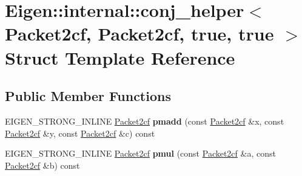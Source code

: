 \hypertarget{struct_eigen_1_1internal_1_1conj__helper_3_01_packet2cf_00_01_packet2cf_00_01true_00_01true_01_4}{}\section{Eigen\+::internal\+::conj\+\_\+helper$<$ Packet2cf, Packet2cf, true, true $>$ Struct Template Reference}
\label{struct_eigen_1_1internal_1_1conj__helper_3_01_packet2cf_00_01_packet2cf_00_01true_00_01true_01_4}
\subsection*{Public Member Functions}
\begin{DoxyCompactItemize}
\item 
\mbox{\label{struct_eigen_1_1internal_1_1conj__helper_3_01_packet2cf_00_01_packet2cf_00_01true_00_01true_01_4_a8bf77b0b220423fcc876b5ad49c99e61}} 
E\+I\+G\+E\+N\+\_\+\+S\+T\+R\+O\+N\+G\+\_\+\+I\+N\+L\+I\+NE \mbox{\hyperlink{struct_eigen_1_1internal_1_1_packet2cf}{Packet2cf}} {\bfseries pmadd} (const \mbox{\hyperlink{struct_eigen_1_1internal_1_1_packet2cf}{Packet2cf}} \&x, const \mbox{\hyperlink{struct_eigen_1_1internal_1_1_packet2cf}{Packet2cf}} \&y, const \mbox{\hyperlink{struct_eigen_1_1internal_1_1_packet2cf}{Packet2cf}} \&c) const
\item 
\mbox{\label{struct_eigen_1_1internal_1_1conj__helper_3_01_packet2cf_00_01_packet2cf_00_01true_00_01true_01_4_a6956a6a7b0de2fd58bd9a8ab2e3c25ae}} 
E\+I\+G\+E\+N\+\_\+\+S\+T\+R\+O\+N\+G\+\_\+\+I\+N\+L\+I\+NE \mbox{\hyperlink{struct_eigen_1_1internal_1_1_packet2cf}{Packet2cf}} {\bfseries pmul} (const \mbox{\hyperlink{struct_eigen_1_1internal_1_1_packet2cf}{Packet2cf}} \&a, const \mbox{\hyperlink{struct_eigen_1_1internal_1_1_packet2cf}{Packet2cf}} \&b) const
\item 
\mbox{\label{struct_eigen_1_1internal_1_1conj__helper_3_01_packet2cf_00_01_packet2cf_00_01true_00_01true_01_4_a8bf77b0b220423fcc876b5ad49c99e61}} 

\end{DoxyCompactItemize}
